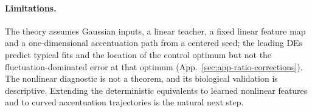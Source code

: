\paragraph{Limitations.}
The theory assumes Gaussian inputs, a linear teacher, a fixed linear feature map and a one-dimensional accentuation path from a centered seed; the leading DEs predict typical fits and the location of the control optimum but not the fluctuation-dominated error at that optimum (App.~\ref{sec:app-ratio-corrections}). The nonlinear diagnostic is not a theorem, and its biological validation is descriptive. Extending the deterministic equivalents to learned nonlinear features and to curved accentuation trajectories is the natural next step.

